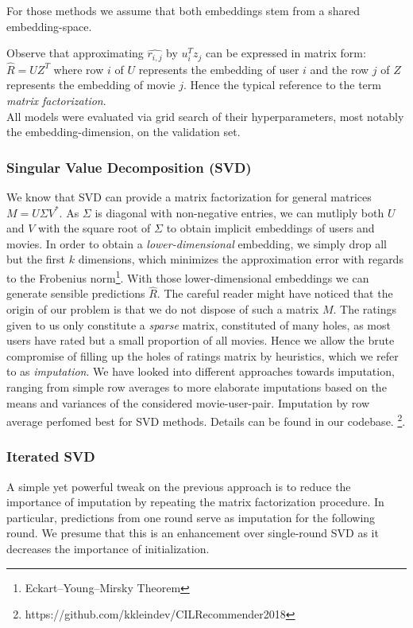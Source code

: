 \documentclass[10pt,conference,compsocconf]{IEEEtran}
\begin{document}
For those methods we assume that both embeddings stem from a shared embedding-space.

Observe that approximating $\widehat{r_{i,j}}$ by $u_i^Tz_j$ can be expressed in matrix form: $\widehat{R} = UZ^T$ where row $i$ of $U$ represents the embedding of user $i$ and the row $j$ of $Z$ represents the embedding of movie $j$. Hence the typical reference to the term \emph{matrix factorization}.\\

All models were evaluated via grid search of their hyperparameters, most notably the embedding-dimension, on the validation set.

\subsubsection{Singular Value Decomposition (SVD)}

We know that SVD can provide a matrix factorization for general matrices $M = U \Sigma V^*$. As $\Sigma$ is diagonal with non-negative entries, we can mutliply both $U$ and $V$ with the square root of $\Sigma$ to obtain implicit embeddings of users and movies. In order to obtain a \emph{lower-dimensional} embedding, we simply drop all but the first $k$ dimensions, which minimizes the approximation error with regards to the Frobenius norm\footnote{Eckart–Young–Mirsky Theorem}. With those lower-dimensional embeddings we can generate sensible predictions $\hat{R}$. The careful reader might have noticed that the origin of our problem is that we do not dispose of such a matrix $M$. The ratings given to us only constitute a \emph{sparse} matrix, constituted of many holes, as most users have rated but a small proportion of all movies. Hence we allow the brute compromise of filling up the holes of ratings matrix by heuristics, which we refer to as \emph{imputation}.
We have looked into different approaches towards imputation, ranging from simple row averages to more elaborate imputations based on the means and variances of the considered movie-user-pair. Imputation by row average perfomed best for SVD methods. Details can be found in our codebase. \footnote{https://github.com/kkleindev/CILRecommender2018}.

\subsubsection{Iterated SVD}
A simple yet powerful tweak on the previous approach is to reduce the importance of imputation by repeating the matrix factorization procedure. In particular, predictions from one round serve as imputation for the following round. We presume that this is an enhancement over single-round SVD as it decreases the importance of initialization.
\end{document}
